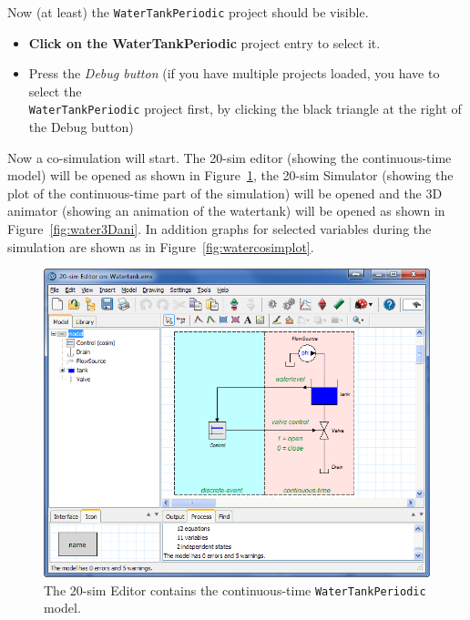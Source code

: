 \documentclass{crescendorepchap}
\begin{document}
Now (at least) the \texttt{WaterTankPeriodic} project should be visible.

\begin{itemize}
\item
  \textbf{Click on the WaterTankPeriodic} project entry to select it.
\item
  Press the \emph{Debug button}
  (if you have multiple
  projects loaded, you have to select the \\ \texttt{WaterTankPeriodic} project first, by
  clicking the black triangle at the right of the Debug button)
\end{itemize}

Now a co-simulation will start. The 20-sim editor (showing the
continuous-time model) will be opened as shown in
Figure~\ref{fig:watertankeditor}, the 20-sim Simulator (showing the
plot of the continuous-time part of the simulation) will be opened and
the 3D animator (showing an animation of the watertank) will be opened
as shown in Figure~\ref{fig:water3Dani}. In addition graphs for
selected variables during the simulation are shown as in
Figure~\ref{fig:watercosimplot}.

\begin{figure}[htbp]
\centering
\includegraphics[width=.9\textwidth]{images/20simEditorWaterTank.png}
\caption{The 20-sim Editor contains the continuous-time \texttt{WaterTankPeriodic} model.\label{fig:watertankeditor}}
\end{figure}
\end{document}
